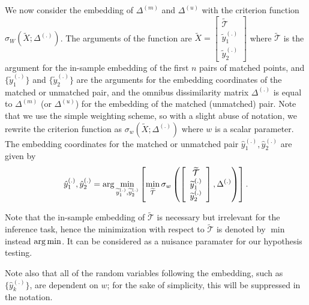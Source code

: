 \documentclass[12pt,oneside,final]{thesis}\usepackage[]{graphicx}\usepackage[]{color}
\begin{document}


 We now consider the embedding of $\Delta^{(m)}$ and $\Delta^{(u)}$ with the criterion function  $\sigma_W(\widetilde{X}; \Delta^{(.)})$. The arguments of the function are  $\widetilde{X}= \left[
\begin{array}{c}
{\widetilde{\mathcal{T}}} \\
\widetilde{y}_{1}^{(.)} \\
\widetilde{y}_{2}^{(.)}
\end {array}
\right]$ where ${\widetilde{\mathcal{T}}}$ is the argument for the in-sample embedding of the first $n$ pairs of matched points, and
 $\{\widetilde{y}_{1}^{(.)} \}$ and $\{\widetilde{y}_{2}^{(.)} \}$ are the arguments for the embedding coordinates of the matched  or unmatched pair,
and the omnibus dissimilarity matrix $\Delta^{(.)}$ is equal to  $\Delta^{(m)}$  (or $\Delta^{(u)}$) for the embedding of the  matched (unmatched) pair. Note that we use the simple weighting scheme, so with a slight abuse of notation, we rewrite the criterion function as  $\sigma_w(\widetilde{X}; \Delta^{(.)})$ where $w$ is a scalar parameter.
The embedding coordinates for the matched or unmatched pair  ${\hat{y}_{1}^{(.)},\hat{y}_{2}^{(.)}}$ are given by
 \[
{\hat{y}_{1}^{(.)},\hat{y}_{2}^{(.)}}
=\arg\min_{\widetilde{y}_{1}^{(.)}, \widetilde{y}_{2}^{(.)}}\left[\min_{\widetilde{\mathcal{T}}}
{\sigma_w\left(
\left[
\begin{array}{c}
{\widetilde{\mathcal{T}}} \\
\widetilde{y}_{1}^{(.)} \\
\widetilde{y}_{2}^{(.)}
\end {array}
\right]
,
\Delta^{(.)}
\right)
}
\right]. \label{oos-embedding}
\]

\begin{remark}
 Note that the in-sample embedding of $\widetilde{\mathcal{T}}$ is necessary but irrelevant for the inference task, hence the minimization with respect to $\widetilde{\mathcal{T}}$ is denoted by  $\min$ instead $\arg\min$. It can be considered as a nuisance paramater for our hypothesis testing.
\end{remark}
\begin{remark}
 Note also that  all of the random variables following the embedding, such as $\{\hat{y}_{k}^{(.)}\}\!$,  are dependent on $w$; for the sake of simplicity, this will  be suppressed in the notation. 
\end{remark}
\end{document}
